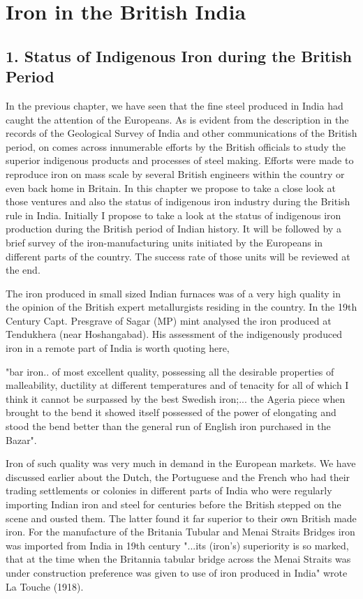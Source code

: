 
\chapter{Iron in the British India}\label{chapter6}

\section*{1. Status of Indigenous Iron during the British Period}

In the previous chapter, we have seen that the fine steel produced in India had caught the attention of the Europeans. As is evident from the description in the records of the Geological Survey of India and other communications of the British period, on comes across innumerable efforts by the British officials to study the superior indigenous products and processes of steel making. Efforts were made to reproduce iron on mass scale by several British engineers within the country or even back home in Britain. In this chapter we propose to take a close look at those ventures and also the status of indigenous iron industry during the British rule in India. Initially I propose to take a look at the status of indigenous iron production during the British period of Indian history. It will be followed by a brief survey of the iron-manufacturing units initiated by the Europeans in different parts of the country. The success rate of those units will be reviewed at the end.

The iron produced in small sized Indian furnaces was of a very high quality in the opinion of the British expert metallurgists residing in the country. In the 19th Century Capt. Presgrave of Sagar (MP) mint analysed the iron produced at Tendukhera (near Hoshangabad). His assessment of the indigenously produced iron in a remote part of India is worth quoting here,

\begin{myquote}
"bar iron.. of most excellent quality, possessing all the desirable properties of malleability, ductility at different temperatures and of tenacity for all of which I think it cannot be surpassed by the best Swedish iron;... the Ageria piece when brought to the bend it showed itself possessed of the power of elongating and stood the bend better than the general run of English iron purchased in the Bazar".
\end{myquote}

Iron of such quality was very much in demand in the European markets. We have discussed earlier about the Dutch, the Portuguese and the French who had their trading settlements or colonies in different parts of India who were regularly importing Indian iron and steel for centuries before the British stepped on the scene and ousted them. The latter found it far superior to their own British made iron. For the manufacture of the Britania Tubular and Menai Straits Bridges iron was imported from India in 19th century "...its (iron's) superiority is so marked, that at the time when the Britannia tabular bridge across the Menai Straits was under construction preference was given to use of iron produced in India" wrote La Touche (1918).

